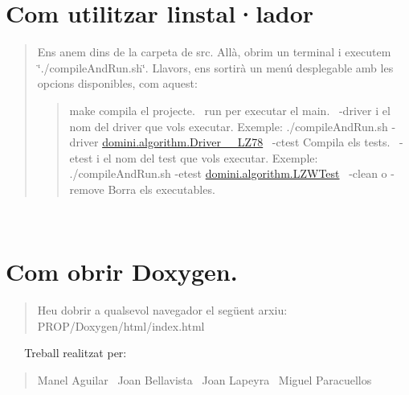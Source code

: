 \section*{Com utilitzar l\textquotesingle{}instal·lador}

\begin{quote}
Ens anem dins de la carpeta de src. Allà, obrim un terminal i executem \char`\"{}./compile\+And\+Run.\+sh\char`\"{}. Llavors, ens sortirà un menú desplegable amb les opcions disponibles, com aquest\+: \begin{quote}
make compila el projecte.~\newline
 run per executar el main.~\newline
 -\/driver i el nom del driver que vols executar. Exemple\+: ./compile\+And\+Run.sh -\/driver \hyperlink{classdomini_1_1algorithm_1_1Driver____LZ78}{domini.\+algorithm.\+Driver\+\_\+\+\_\+\+L\+Z78}~\newline
 -\/ctest Compila els tests.~\newline
 -\/etest i el nom del test que vols executar. Exemple\+: ./compile\+And\+Run.sh -\/etest \hyperlink{classdomini_1_1algorithm_1_1LZWTest}{domini.\+algorithm.\+L\+Z\+W\+Test}~\newline
 -\/clean o -\/remove Borra els executables. \end{quote}
\end{quote}
~\newline


\section*{Com obrir Doxygen.}

\begin{quote}
Heu d\textquotesingle{}obrir a qualsevol navegador el següent arxiu\+: P\+R\+O\+P/\+Doxygen/html/index.\+html \end{quote}


~\newline
 ~\newline
 Treball realitzat per\+:~\newline
 \begin{quote}
Manel Aguilar~\newline
 Joan Bellavista~\newline
 Joan Lapeyra~\newline
 Miguel Paracuellos~\newline
\end{quote}
